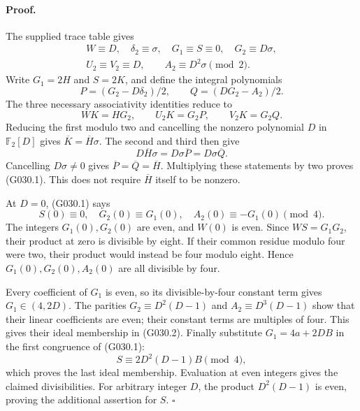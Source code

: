 \paragraph{Proof.}
The supplied trace table gives
\[
 \begin{gathered}
 W\equiv D,\quad\delta_2\equiv\sigma,\quad
 G_1\equiv S\equiv0,\quad G_2\equiv D\sigma,\\
 U_2\equiv V_2\equiv D,\qquad A_2\equiv D^2\sigma
       \pmod2.
 \end{gathered}
\]
Write $G_1=2H$ and $S=2K$, and define the integral
polynomials
\[
 P=(G_2-D\delta_2)/2,\qquad
 Q=(DG_2-A_2)/2.
\]
The three necessary associativity identities reduce to
\[
 WK=HG_2,\qquad U_2K=G_2P,\qquad V_2K=G_2Q.
\]
Reducing the first modulo two and cancelling the
nonzero polynomial $D$ in $\mathbb F_2[D]$ gives
$\overline K=\overline H\sigma$.
The second and third then give
\[
 D\overline H\sigma=D\sigma\overline P
                       =D\sigma\overline Q.
\]
Cancelling $D\sigma\ne0$ gives
$\overline P=\overline Q=\overline H$.
Multiplying these statements by two proves (G030.1).
This does not require $\overline H$ itself to be nonzero.

At $D=0$, (G030.1) says
\[
 S(0)\equiv0,\quad G_2(0)\equiv G_1(0),\quad
 A_2(0)\equiv-G_1(0)\pmod4.
\]
The integers $G_1(0),G_2(0)$ are even, and $W(0)$
is even. Since $WS=G_1G_2$, their product at zero
is divisible by eight. If their common residue
modulo four were two, their product would instead
be four modulo eight. Hence $G_1(0),G_2(0),A_2(0)$
are all divisible by four.

Every coefficient of $G_1$ is even, so its divisible-by-four
constant term gives $G_1\in(4,2D)$. The parities
$G_2\equiv D^2(D-1)$ and
$A_2\equiv D^3(D-1)$ show that their linear
coefficients are even; their constant terms are
multiples of four. This gives their ideal membership
in (G030.2). Finally substitute $G_1=4a+2DB$
in the first congruence of (G030.1):
\[
 S\equiv2D^2(D-1)B\pmod4,
\]
which proves the last ideal membership. Evaluation
at even integers gives the claimed divisibilities.
For arbitrary integer $D$, the product $D^2(D-1)$
is even, proving the additional assertion for $S$.
\hfill$\square$

